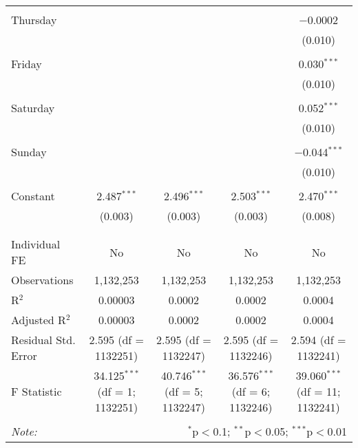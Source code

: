 \documentclass[
]{article}
\begin{document}
\begin{table}[!htbp]
{\begin{tabular}{@{\extracolsep{5pt}}lcccc}
  & & & & \\ 
 Thursday &  &  &  & $-$0.0002 \\ 
  &  &  &  & (0.010) \\ 
  & & & & \\ 
 Friday &  &  &  & 0.030$^{***}$ \\ 
  &  &  &  & (0.010) \\ 
  & & & & \\ 
 Saturday &  &  &  & 0.052$^{***}$ \\ 
  &  &  &  & (0.010) \\ 
  & & & & \\ 
 Sunday &  &  &  & $-$0.044$^{***}$ \\ 
  &  &  &  & (0.010) \\ 
  & & & & \\ 
 Constant & 2.487$^{***}$ & 2.496$^{***}$ & 2.503$^{***}$ & 2.470$^{***}$ \\ 
  & (0.003) & (0.003) & (0.003) & (0.008) \\ 
  & & & & \\ 
\hline \\[-1.8ex] 
Individual FE & No & No & No & No \\ 
Observations & 1,132,253 & 1,132,253 & 1,132,253 & 1,132,253 \\ 
R$^{2}$ & 0.00003 & 0.0002 & 0.0002 & 0.0004 \\ 
Adjusted R$^{2}$ & 0.00003 & 0.0002 & 0.0002 & 0.0004 \\ 
Residual Std. Error & 2.595 (df = 1132251) & 2.595 (df = 1132247) & 2.595 (df = 1132246) & 2.594 (df = 1132241) \\ 
F Statistic & 34.125$^{***}$ (df = 1; 1132251) & 40.746$^{***}$ (df = 5; 1132247) & 36.576$^{***}$ (df = 6; 1132246) & 39.060$^{***}$ (df = 11; 1132241) \\ 
\hline 
\hline \\[-1.8ex] 
\textit{Note:}  & \multicolumn{4}{r}{$^{*}$p$<$0.1; $^{**}$p$<$0.05; $^{***}$p$<$0.01} \\ 
\end{tabular}
} 
\end{table} 
\newpage
\end{document}
